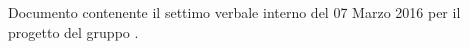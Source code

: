 Documento contenente il settimo verbale interno del 07 Marzo 2016 per il progetto \progetto{} del gruppo \gruppo{}.
